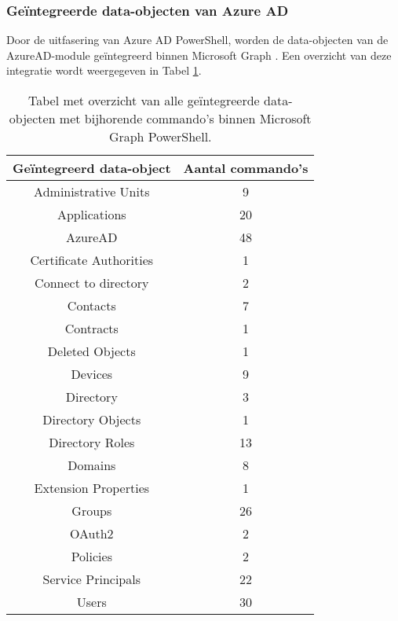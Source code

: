 \subsubsection{Geïntegreerde data-objecten van Azure AD}

Door de uitfasering van Azure \ac{AD} PowerShell, worden de data-objecten van de AzureAD-module geïntegreerd binnen Microsoft Graph \autocite{Microsoft2023l}. Een overzicht van deze integratie wordt weergegeven in Tabel \ref{MSGDOT}.

\begin{table}
    \small
    \centering
    \begin{tabular}{ |c|c| } 
        \hline
        \textbf{Geïntegreerd data-object} & \textbf{Aantal commando's} \\
        \hline
        Administrative Units & 9 \\ 
        Applications & 20 \\ 
        AzureAD & 48 \\ 
        Certificate Authorities & 1 \\ 
        Connect to directory & 2 \\ 
        Contacts & 7 \\ 
        Contracts & 1 \\ 
        Deleted Objects & 1 \\ 
        Devices & 9 \\    
        Directory & 3 \\
        Directory Objects & 1 \\ 
        Directory Roles & 13 \\ 
        Domains & 8 \\ 
        Extension Properties & 1 \\ 
        Groups & 26 \\ 
        OAuth2 & 2 \\ 
        Policies & 2 \\ 
        Service Principals & 22 \\ 
        Users & 30 \\ 
        \hline
    \end{tabular}
    \caption[Tabel geïntegreerde data-objecten]{Tabel met overzicht van alle geïntegreerde data-objecten met bijhorende commando's binnen Microsoft Graph PowerShell.}
    \label{MSGDOT}
\end{table}


